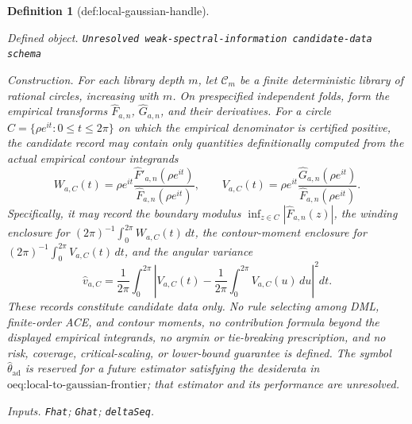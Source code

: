 \documentclass{article}
\newtheorem{definition}{Definition}
\begin{document}
\begin{definition}[def:local-gaussian-handle]\label{def:local-gaussian-handle}
\par\smallskip\noindent\emph{Defined object.} \texttt{Unresolved weak-\allowbreak{}spectral-\allowbreak{}information candidate-\allowbreak{}data schema}
\par\smallskip\noindent\emph{Construction.} For each library depth \(m\), let \(\mathscr C_m\) be a finite deterministic library of rational circles, increasing with \(m\).  On prespecified independent folds, form the empirical transforms \(\widehat F_{a,n}\), \(\widehat G_{a,n}\), and their derivatives.  For a circle \(C=\{\rho e^{it}:0\le t\le2\pi\}\) on which the empirical denominator is certified positive, the candidate record may contain only quantities definitionally computed from the actual empirical contour integrands
\[
 W_{a,C}(t)=\rho e^{it}
 \frac{\widehat F'_{a,n}(\rho e^{it})}
      {\widehat F_{a,n}(\rho e^{it})},
 \qquad
 V_{a,C}(t)=\rho e^{it}
 \frac{\widehat G_{a,n}(\rho e^{it})}
      {\widehat F_{a,n}(\rho e^{it})}.
\]
Specifically, it may record the boundary modulus \(\inf_{z\in C}|\widehat F_{a,n}(z)|\), the winding enclosure for \((2\pi)^{-1}\int_0^{2\pi}W_{a,C}(t)\,dt\), the contour-moment enclosure for \((2\pi)^{-1}\int_0^{2\pi}V_{a,C}(t)\,dt\), and the angular variance
\[
 \widehat v_{a,C}
 =\frac1{2\pi}\int_0^{2\pi}
 \left|V_{a,C}(t)-
 \frac1{2\pi}\int_0^{2\pi}V_{a,C}(u)\,du\right|^2dt.
\]
These records constitute candidate data only.  No rule selecting among DML, finite-order ACE, and contour moments, no contribution formula beyond the displayed empirical integrands, no argmin or tie-breaking prescription, and no risk, coverage, critical-scaling, or lower-bound guarantee is defined.  The symbol \(\widehat\theta_{\mathrm{ad}}\) is reserved for a future estimator satisfying the desiderata in \(\text{oeq:local-to-gaussian-frontier}\); that estimator and its performance are unresolved.
\par\smallskip\noindent\emph{Inputs.} \texttt{Fhat}; \texttt{Ghat}; \texttt{deltaSeq}.
\end{definition}
\end{document}
